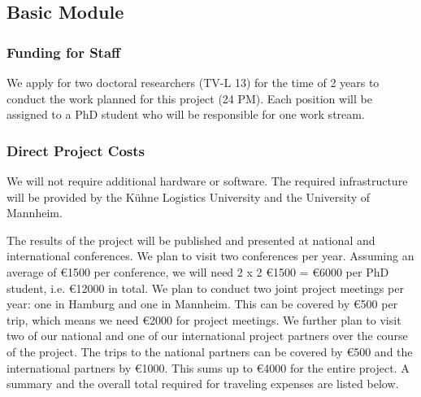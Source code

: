  \subsection{Basic Module}
\subsubsection{Funding for Staff}
\label{sec:staff}

We apply for two doctoral researchers (TV-L 13) for the time of 2 years to conduct the work planned for this project (24 PM). Each position will be assigned to a PhD student who will be responsible for one work stream.

\begin{funds}
\end{funds}

\subsubsection{Direct Project Costs}


We will not require additional hardware or software. The required infrastructure will be provided by the K\"uhne Logistics University and the University of Mannheim.

\label{sec:costs:travel}
The results of the project will be published and presented at national and international conferences. We plan to visit two conferences per year. Assuming an average of \euro1500 per conference, we will need 2 x 2 \euro1500 = \euro6000 per PhD student, i.e. \euro12000 in total. We plan to conduct two joint project meetings per year: one in Hamburg and one in Mannheim. This can be covered by \euro500 per trip, which means we need \euro2000 for project meetings. We further plan to visit two of our national and one of our international project partners over the course of the project. The trips to the national partners can be covered by \euro500 and the international partners by \euro1000. This sums up to \euro4000 for the entire project. A summary and the overall total required for traveling expenses are listed below. \\

\begin{funds}
\end{funds}


